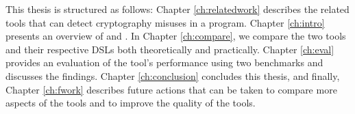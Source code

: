 This thesis is structured as follows: Chapter \ref{ch:relatedwork} describes the related tools that can detect cryptography misuses in a program. Chapter \ref{ch:intro} presents an overview of \codyze{} and \cognicryptsast. In Chapter \ref{ch:compare}, we compare the two tools and their respective DSLs both theoretically and practically. Chapter \ref{ch:eval} provides an evaluation of the tool's performance using two benchmarks and discusses the findings. Chapter \ref{ch:conclusion} concludes this thesis, and finally, Chapter \ref{ch:fwork} describes future actions that can be taken to compare more aspects of the tools and to improve the quality of the tools.
